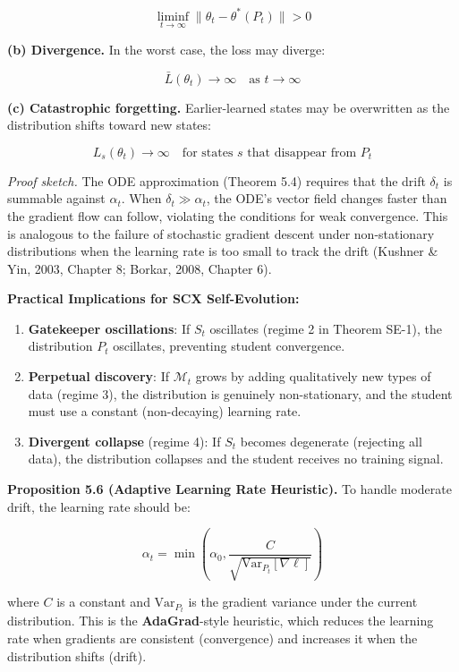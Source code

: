\documentclass[
  12pt,
]{article}
\begin{document}
\[
\liminf_{t \to \infty} \|\theta_t - \theta^*(P_t)\| > 0
\]

\textbf{(b) Divergence.} In the worst case, the loss may diverge:

\[
\bar{L}(\theta_t) \to \infty \quad \text{as } t \to \infty
\]

\textbf{(c) Catastrophic forgetting.} Earlier-learned states may be
overwritten as the distribution shifts toward new states:

\[
L_s(\theta_t) \to \infty \quad \text{for states } s \text{ that disappear from } P_t
\]

\emph{Proof sketch.} The ODE approximation (Theorem 5.4) requires that
the drift \(\delta_t\) is summable against \(\alpha_t\). When
\(\delta_t \gg \alpha_t\), the ODE's vector field changes faster than
the gradient flow can follow, violating the conditions for weak
convergence. This is analogous to the failure of stochastic gradient
descent under non-stationary distributions when the learning rate is too
small to track the drift (Kushner \& Yin, 2003, Chapter 8; Borkar, 2008,
Chapter 6).

\textbf{Practical Implications for SCX Self-Evolution:}

\begin{enumerate}
\def\labelenumi{\arabic{enumi}.}
\item
  \textbf{Gatekeeper oscillations}: If \(S_t\) oscillates (regime 2 in
  Theorem SE-1), the distribution \(P_t\) oscillates, preventing student
  convergence.
\item
  \textbf{Perpetual discovery}: If \(\mathcal{M}_t\) grows by adding
  qualitatively new types of data (regime 3), the distribution is
  genuinely non-stationary, and the student must use a constant
  (non-decaying) learning rate.
\item
  \textbf{Divergent collapse} (regime 4): If \(S_t\) becomes degenerate
  (rejecting all data), the distribution collapses and the student
  receives no training signal.
\end{enumerate}

\textbf{Proposition 5.6 (Adaptive Learning Rate Heuristic).} To handle
moderate drift, the learning rate should be:

\[
\alpha_t = \min\left(\alpha_0, \frac{C}{\sqrt{\text{Var}_{P_t}[\nabla \ell]}}\right)
\]

where \(C\) is a constant and \(\text{Var}_{P_t}\) is the gradient
variance under the current distribution. This is the
\textbf{AdaGrad}-style heuristic, which reduces the learning rate when
gradients are consistent (convergence) and increases it when the
distribution shifts (drift).
\end{document}
